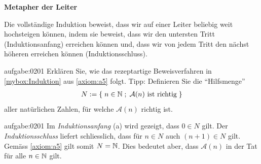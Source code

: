 \begin{mdframed}[backgroundcolor=NavajoWhite!30,nobreak=true]\label{mdframed:Metapher}
\textbf{Metapher der Leiter}
\vspace{0.2cm}

\noindent
Die vollständige Induktion beweist, dass wir auf einer Leiter beliebig weit hochsteigen können, indem sie beweist, dass wir den untersten Tritt (Induktionsanfang) erreichen
können und, dass wir von jedem Tritt den nächst höheren erreichen können (Induktionsschluss).
\end{mdframed}

\begin{aufgabe}{aufgabe:0201}
Erklären Sie, wie das rezeptartige Beweisverfahren in \cref{mybox:Induktion} aus \cref{axiom:a5} folgt. Tipp: Definieren Sie die \enquote{Hilfsmenge}
\begin{align*}
    N := \left\{\;n\in\mathbb{N} \; ; \; \text{$\mathcal{A}(n)$ ist richtig} \;\right\}
\end{align*}
aller natürlichen Zahlen, für welche $\mathcal{A}(n)$ richtig ist.
\end{aufgabe}
\begin{antwort}{aufgabe:0201}
Im \textit{Induktionsanfang} (a) wird gezeigt, dass $0\in N$ gilt. Der \textit{Induktionsschluss} liefert schliesslich, dass für $n\in N$ auch $(n+1)\in N$ gilt. Gemäss \cref{axiom:a5} gilt somit $N=\mathbb{N}$. Dies bedeutet aber, dass $\mathcal{A}(n)$ in der Tat für alle $n\in\mathbb{N}$ gilt.
\end{antwort}

